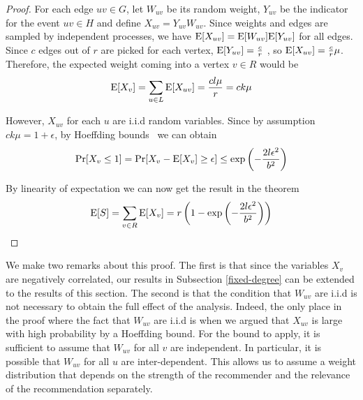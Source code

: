 \begin{proof}
For each edge $uv\in G$, let $W_{uv}$ be its random weight, $Y_{uv}$ be
the indicator for the event $uv\in H$ and define $X_{uv} = Y_{uv}
W_{uv}$. Since weights and edges are sampled by independent processes,
we have $\text{E}[X_{uv}] = \text{E}[W_{uv}]\text{E}[Y_{uv}]$ for all edges. Since $c$
edges out of $r$ are picked for each vertex, $\text{E}[Y_{uv}] = \frac{c}{r}$
, so $\text{E}[X_{uv}] = \frac{c}{r}\mu$. Therefore, the expected weight
coming into a vertex $v\in R$ would be
\[ \text{E}[X_v] = \sum_{u\in L} \text{E}[X_{uv}] = \frac{cl\mu}{r} = ck\mu\]

However, $X_{uv}$ for each $u$ are i.i.d random variables. Since by
assumption $ck\mu = 1+\epsilon$, by Hoeffding bounds~\cite{Hoeffding1963}
we can obtain
\[ \Pr[X_v \leq 1] = \Pr[X_v - \text{E}[X_v] \geq \epsilon] \leq \exp\left(-\frac{2l\epsilon^2}{b^2}\right) \]

By linearity of expectation we can now get the result in the theorem
\[ \text{E}[S] = \sum_{v\in R} \text{E}[X_v] = r\left(1-\exp\left(-\frac{2l\epsilon^2}{b^2}\right)\right) \]
\end{proof}
We make two remarks about this proof. The first is that
since the variables $X_v$ are negatively correlated, our results in
Subsection \ref{fixed-degree} can be extended to the results of this
section. The second is that the condition that $W_{uv}$ are i.i.d
is not necessary to obtain the full effect of the analysis. Indeed,
the only place in the proof where the fact that $W_{uv}$ are i.i.d
is when we argued that $X_{uv}$ is large with high probability by a
Hoeffding bound. For the bound to apply, it is sufficient to assume
that $W_{uv}$ for all $v$ are independent. In particular, it is
possible that $W_{uv}$ for all $u$ are inter-dependent. This allows
us to assume a weight distribution that depends on the strength of
the recommender and the relevance of the recommendation separately.
